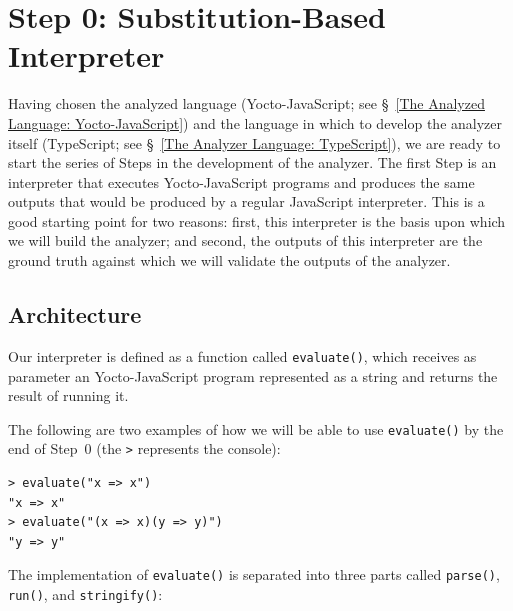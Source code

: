 \documentclass[12pt, oneside]{book}
\begin{document}
\section{Step 0: Substitution-Based Interpreter}
\label{Step 0: Substitution-Based Interpreter}

Having chosen the analyzed language (Yocto-JavaScript; see §~\ref{The Analyzed Language: Yocto-JavaScript}) and the language in which to develop the analyzer itself (TypeScript; see §~\ref{The Analyzer Language: TypeScript}), we are ready to start the series of Steps in the development of the analyzer. The first Step is an interpreter that executes Yocto-JavaScript programs and produces the same outputs that would be produced by a regular JavaScript interpreter. This is a good starting point for two reasons: first, this interpreter is the basis upon which we will build the analyzer; and second, the outputs of this interpreter are the ground truth against which we will validate the outputs of the analyzer.

\subsection{Architecture}
\label{Architecture}

Our interpreter is defined as a function called \texttt{evaluate()}, which receives as parameter an Yocto-JavaScript program represented as a string and returns the result of running it.

The following are two examples of how we will be able to use \texttt{evaluate()} by the end of Step~0 (the \texttt{>} represents the console):

\begin{verbatim}
> evaluate("x => x")
"x => x"
> evaluate("(x => x)(y => y)")
"y => y"
\end{verbatim}

The implementation of \texttt{evaluate()} is separated into three parts called \texttt{parse()}, \texttt{run()}, and \texttt{stringify()}:
\end{document}
